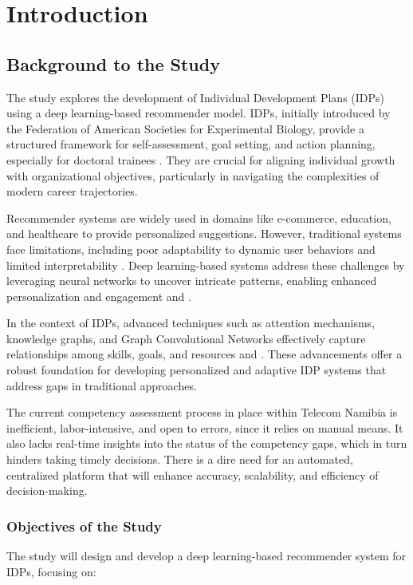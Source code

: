 \chapter{Introduction}
\label{chapter:intro}

\section{Background to the Study}
The study explores the development of Individual Development Plans (IDPs) using a deep learning-based recommender model. IDPs, initially introduced by the Federation of American Societies for Experimental Biology, provide a structured framework for self-assessment, goal setting, and action planning, especially for doctoral trainees \cite{vanderford2018cross}. They are crucial for aligning individual growth with organizational objectives, particularly in navigating the complexities of modern career trajectories.

Recommender systems are widely used in domains like e-commerce, education, and healthcare to provide personalized suggestions. However, traditional systems face limitations, including poor adaptability to dynamic user behaviors and limited interpretability \cite{sahoo2019deepreco}. Deep learning-based systems address these challenges by leveraging neural networks to uncover intricate patterns, enabling enhanced personalization and engagement \cite{mu2018survey} and \cite{li2024attention}.

In the context of IDPs, advanced techniques such as attention mechanisms, knowledge graphs, and Graph Convolutional Networks effectively capture relationships among skills, goals, and resources \cite{li2024attention} and \cite{chen2024intelligent}. These advancements offer a robust foundation for developing personalized and adaptive IDP systems that address gaps in traditional approaches.

The current competency assessment process in place within Telecom Namibia is inefficient, labor-intensive, and open to errors, since it relies on manual means. It also lacks real-time insights into the status of the competency gaps, which in turn hinders taking timely decisions. There is a dire need for an automated, centralized platform that will enhance accuracy, scalability, and efficiency of decision-making.

\subsection{Objectives of the Study}
The study will design and develop a deep learning-based recommender system for IDPs, focusing on:

